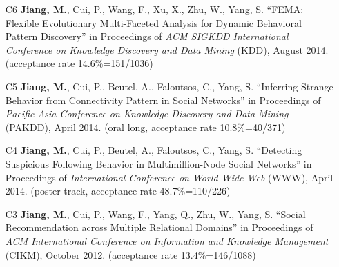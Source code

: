 \documentclass[10pt]{article}
\newenvironment{myindentpar}[1]%
{\begin{list}{}%
         {\setlength{\leftmargin}{#1}}%
         \item[]%
}
{\end{list}}
\newcounter{list}
\newcommand{\hide}[1]{}
\begin{document}
\begin{myindentpar}{0.00cm}
\begin{enumerate}[leftmargin=.5cm]
	\hide{\vspace{-0.1cm}\hspace{0.5cm}{\small \emph{I conceived the idea in consultation with Dr. Faloutsos. I designed the study, did the experiments, and wrote the paper. Drs. Beutel and Faloutsos edited the paper.}}}

\item[C6] \textbf{Jiang, M.}, Cui, P., Wang, F., Xu, X., Zhu, W., Yang, S. ``FEMA: Flexible Evolutionary Multi-Faceted Analysis for Dynamic Behavioral Pattern Discovery'' in Proceedings of \emph{ACM SIGKDD International Conference on Knowledge Discovery and Data Mining} (KDD), August 2014. (acceptance rate 14.6\%=151/1036)

	\hide{\vspace{-0.1cm}\hspace{0.5cm}{\small \emph{I conceived the idea in consultation with Drs. Cui and Wang. I designed the study, completed the experiments, and wrote the paper.}}}

\item[C5] \textbf{Jiang, M.}, Cui, P., Beutel, A., Faloutsos, C., Yang, S. ``Inferring Strange Behavior from Connectivity Pattern in Social Networks'' in Proceedings of \emph{Pacific-Asia Conference on Knowledge Discovery and Data Mining} (PAKDD), April 2014. (oral long, acceptance rate 10.8\%=40/371)

	\hide{\vspace{-0.1cm}\hspace{0.5cm}{\small \emph{I conceived the idea, designed the study, did the experiments, and wrote the paper.}}}

\item[C4] \textbf{Jiang, M.}, Cui, P., Beutel, A., Faloutsos, C., Yang, S. ``Detecting Suspicious Following Behavior in Multimillion-Node Social Networks'' in Proceedings of \emph{International Conference on World Wide Web} (WWW), April 2014. (poster track, acceptance rate 48.7\%=110/226)

	\hide{\vspace{-0.1cm}\hspace{0.5cm}{\small \emph{I conceived the idea, designed the study, did the experiments, and wrote the paper.}}}

\item[C3] \textbf{Jiang, M.}, Cui, P., Wang, F., Yang, Q., Zhu, W., Yang, S. ``Social Recommendation across Multiple Relational Domains'' in Proceedings of \emph{ACM International Conference on Information and Knowledge Management} (CIKM), October 2012. (acceptance rate 13.4\%=146/1088)


\end{enumerate}
\end{myindentpar}
\end{document}

